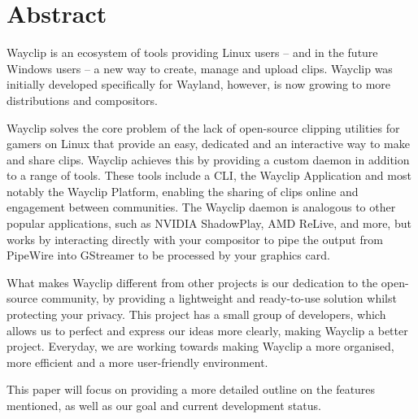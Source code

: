 \chapter{Abstract}

Wayclip is an ecosystem of tools providing Linux users -- and in the future Windows users -- a new way to create, manage and upload clips.
Wayclip was initially developed specifically for Wayland, however, is now growing to more distributions and compositors.

Wayclip solves the core problem of the lack of open-source clipping utilities for gamers on Linux that provide an easy, dedicated and an interactive way to make and share clips.
Wayclip achieves this by providing a custom daemon in addition to a range of tools.
These tools include a CLI, the Wayclip Application and most notably the Wayclip Platform, enabling the sharing of clips online and engagement between communities.
The Wayclip daemon is analogous to other popular applications, such as NVIDIA ShadowPlay, AMD ReLive, and more, but works by interacting directly with your compositor to pipe the output from PipeWire into GStreamer to be processed by your graphics card.

What makes Wayclip different from other projects is our dedication to the open-source community, by providing a lightweight and ready-to-use solution whilst protecting your privacy.
This project has a small group of developers, which allows us to perfect and express our ideas more clearly, making Wayclip a better project.
Everyday, we are working towards making Wayclip a more organised, more efficient and a more user-friendly environment.

This paper will focus on providing a more detailed outline on the features mentioned, as well as our goal and current development status.
